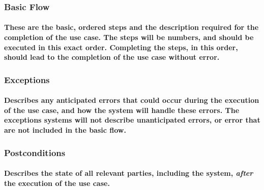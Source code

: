 \subsubsection{Basic Flow}
\paragraph{These are the basic, ordered steps and the description required for the completion of the use case. The steps will be numbers, and should be executed in this exact order. Completing the steps, in this order, should lead to the completion of the use case without error.}

\subsubsection{Exceptions}
\paragraph{Describes any anticipated errors that could occur during the execution of the use case, and how the system will handle these errors. The exceptions systems will not describe unanticipated errors, or error that are not included in the basic flow.}

\subsubsection{Postconditions}
\paragraph{Describes the state of all relevant parties, including the system, \emph{after} the execution of the use case.}
\newpage


